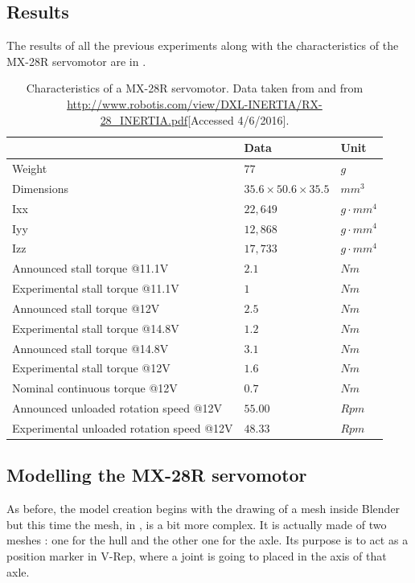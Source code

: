 \subsection{Results}
The results of all the previous experiments along with the characteristics of the MX-28R servomotor are in .
\begin{table}[htp]
\begin{tabularx}{\textwidth}{@{} l X X @{}}
\toprule
& \textbf{Data} & \textbf{Unit}\\ 
\midrule
Weight & $77$ & $g$\\
Dimensions & $35.6 \times 50.6 \times 35.5$ & $mm^3$\\
Ixx & $22,649$ & $g \cdot mm^4$\\
Iyy & $12,868$ & $g \cdot mm^4$\\
Izz & $17,733$ & $g \cdot mm^4$ \\
Announced stall torque @11.1V & $2.1$ & $Nm$\\
Experimental stall torque @11.1V & $1$ & $Nm$\\
Announced stall torque @12V & $2.5$ & $Nm$\\
Experimental stall torque @14.8V & $1.2$ & $Nm$\\
Announced stall torque @14.8V & $3.1$ & $Nm$\\
Experimental stall torque @12V & $1.6$ & $Nm$\\
Nominal continuous torque @12V & $0.7$ & $Nm$\\
Announced unloaded rotation speed @12V & $55.00$ & $Rpm$\\
Experimental unloaded rotation speed @12V & $48.33$ & $Rpm$\\
\bottomrule
\end{tabularx}
\caption[Characteristics of a MX-28R servomotor]{Characteristics of a MX-28R servomotor. Data taken from \cite{mx_28_manual} and from \url{http://www.robotis.com/view/DXL-INERTIA/RX-28_INERTIA.pdf}[Accessed 4/6/2016].}
\label{table:mx28-specs}
\end{table} 

\clearpage
\subsection{Modelling the MX-28R servomotor}
As before, the model creation begins with the drawing of a mesh inside Blender but this time the mesh, in , is a bit more complex. It is actually made of two meshes : one for the hull and the other one for the axle. Its purpose is to act as a position marker in V-Rep, where a joint is going to placed in the axis of that axle. 

